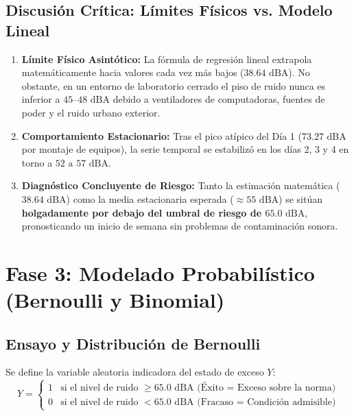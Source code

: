 \documentclass{article}
\begin{document}
\subsection{Discusión Crítica: Límites Físicos vs. Modelo Lineal}
\begin{enumerate}
    \item \textbf{Límite Físico Asintótico:} La fórmula de regresión lineal extrapola matemáticamente hacia valores cada vez más bajos ($38.64\text{ dBA}$). No obstante, en un entorno de laboratorio cerrado el piso de ruido nunca es inferior a $45\text{--}48\text{ dBA}$ debido a ventiladores de computadoras, fuentes de poder y el ruido urbano exterior.
    \item \textbf{Comportamiento Estacionario:} Tras el pico atípico del Día 1 ($73.27\text{ dBA}$ por montaje de equipos), la serie temporal se estabilizó en los días 2, 3 y 4 en torno a $52\text{ a }57\text{ dBA}$.
    \item \textbf{Diagnóstico Concluyente de Riesgo:} Tanto la estimación matemática ($38.64\text{ dBA}$) como la media estacionaria esperada ($\approx 55\text{ dBA}$) se sitúan \textbf{holgadamente por debajo del umbral de riesgo de $65.0\text{ dBA}$}, pronosticando un inicio de semana sin problemas de contaminación sonora.
\end{enumerate}

\section{Fase 3: Modelado Probabilístico (Bernoulli y Binomial)}

\subsection{Ensayo y Distribución de Bernoulli}
Se define la variable aleatoria indicadora del estado de exceso $Y$:
\begin{equation}
    Y = \begin{cases}
        1 & \text{si el nivel de ruido } \ge 65.0\text{ dBA (Éxito = Exceso sobre la norma)} \\
        0 & \text{si el nivel de ruido } < 65.0\text{ dBA (Fracaso = Condición admisible)}
    \end{cases}
\end{equation}
\end{document}

